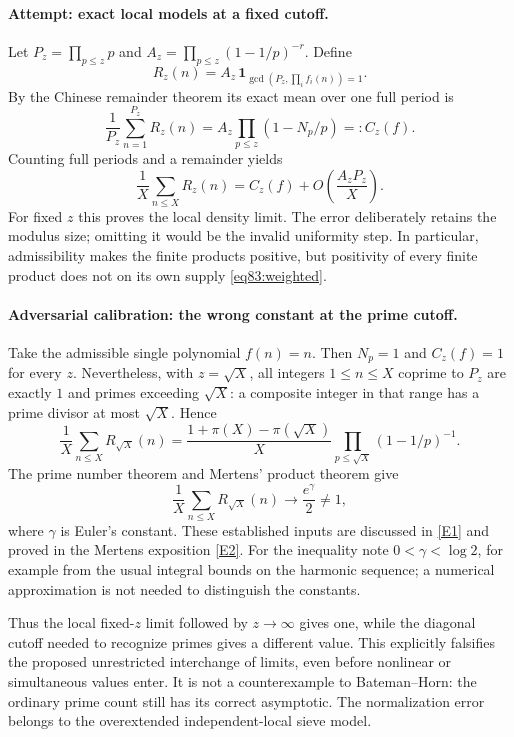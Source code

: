 \documentclass[11pt,a4paper]{article}
\numberwithin{equation}{section}
\newcommand{\eref}[2]{\hyperlink{extra:#1:#2}{[E#2]}}
\begin{document}
\paragraph{Attempt: exact local models at a fixed cutoff.}
Let $P_z=\prod_{p\leq z}p$ and
$A_z=\prod_{p\leq z}(1-1/p)^{-r}$. Define
\[
 R_z(n)=A_z\,\mathbf1_{\gcd(P_z,\prod_i f_i(n))=1}.
\]
By the Chinese remainder theorem its exact mean over one full period is
\begin{equation}\label{eq83:local}
 \frac1{P_z}\sum_{n=1}^{P_z}R_z(n)
 =A_z\prod_{p\leq z}(1-N_p/p)=:C_z(f).
\end{equation}
Counting full periods and a remainder yields
\begin{equation}\label{eq83:error}
 \frac1X\sum_{n\leq X}R_z(n)
       =C_z(f)+O\left(\frac{A_z P_z}{X}\right).
\end{equation}
For fixed $z$ this proves the local density limit. The error deliberately
retains the modulus size; omitting it would be the invalid uniformity
step. In particular, admissibility makes the finite products positive,
but positivity of every finite product does not on its own supply
\eqref{eq83:weighted}.

\paragraph{Adversarial calibration: the wrong constant at the prime cutoff.}
Take the admissible single polynomial $f(n)=n$. Then $N_p=1$ and
$C_z(f)=1$ for every $z$. Nevertheless, with $z=\sqrt X$, all integers
$1\leq n\leq X$ coprime to $P_z$ are exactly $1$ and primes exceeding
$\sqrt X$: a composite integer in that range has a prime divisor at most
$\sqrt X$. Hence
\[
 \frac1X\sum_{n\leq X}R_{\sqrt X}(n)
 =\frac{1+\pi(X)-\pi(\sqrt X)}X
           \prod_{p\leq\sqrt X}(1-1/p)^{-1}.
\]
The prime number theorem and Mertens' product theorem give
\begin{equation}\label{eq83:mismatch}
 \frac1X\sum_{n\leq X}R_{\sqrt X}(n)
       \longrightarrow\frac{e^\gamma}{2}\ne1,
\end{equation}
where $\gamma$ is Euler's constant. These established inputs are discussed
in \eref{statement}{1} and proved in the Mertens exposition \eref{statement}{2}.
For the inequality note $0<\gamma<\log2$, for example from the usual
integral bounds on the harmonic sequence; a numerical approximation is
not needed to distinguish the constants.

Thus the local fixed-$z$ limit followed by $z\to\infty$ gives one, while
the diagonal cutoff needed to recognize primes gives a different value.
This explicitly falsifies the proposed unrestricted interchange of limits,
even before nonlinear or simultaneous values enter. It is not a
counterexample to Bateman--Horn: the ordinary prime count still has its
correct asymptotic. The normalization error belongs to the overextended
independent-local sieve model.
\end{document}

